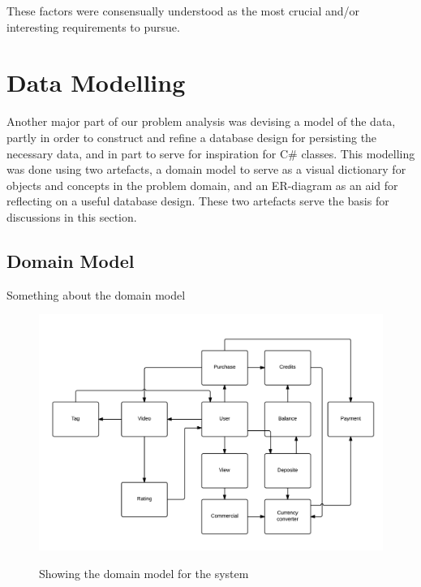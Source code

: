 These factors were consensually understood as the most crucial and/or interesting requirements to pursue.

\section{Data Modelling}
Another major part of our problem analysis was devising a model of the data, partly in order to construct and refine a database design for persisting the necessary data, and in part to serve for inspiration for C\# classes.
This modelling was done using two artefacts, a domain model to serve as a visual dictionary for objects and concepts in the problem domain, and an ER-diagram as an aid for reflecting on a useful database design. These two artefacts serve the basis for discussions in this section.
\subsection{Domain Model}
Something about the domain model

\begin{figure}[H]
\centering
\includegraphics[scale=0.19]{DomainModel.png}
\label{domainmodel}
\caption{Showing the domain model for the system}
\end{figure}

